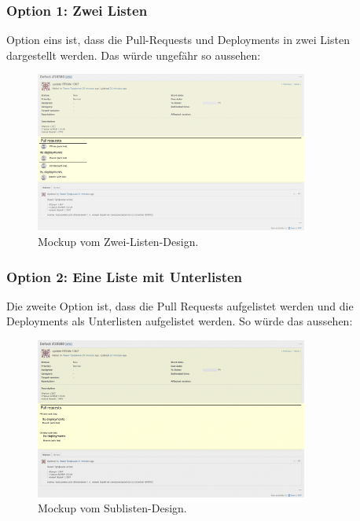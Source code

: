\subsubsection{Option 1: Zwei Listen}
Option eins ist, dass die Pull-Requests und Deployments in zwei Listen dargestellt werden. Das würde ungefähr so
aussehen:
\begin{figure}[H]
  \centering
  \includegraphics[width=0.8\textwidth]{images/mockup/multiple-lists.png}
  \caption[Ein Mockup, bei welchem die Deployments und Pull Requests separate Listen haben.]{Mockup vom Zwei-Listen-Design.}
  \label{fig:mockup_multi_lists}
\end{figure}

\subsubsection{Option 2: Eine Liste mit Unterlisten}
Die zweite Option ist, dass die Pull Requests aufgelistet werden und die Deployments als Unterlisten aufgelistet
werden. So würde das aussehen:
\begin{figure}[H]
  \centering 
  \includegraphics[width=0.8\textwidth]{images/mockup/sublists.png}
  \caption[Ein Mockup, bei welchem die Deployments als Unterlisten aufgelistet werden.]{Mockup vom Sublisten-Design.}
  \label{fig:mockup_sublists}
\end{figure}

